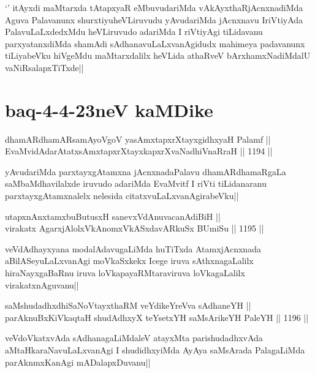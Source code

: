 \begin{artha}
`\stext' itAyxdi maMtarxda tAtapxyaR eMbuvudariMda vAkAyxthaRjAcnxnadiMda Aguva Palavanunx shurxtiyuheVLiruvudu yAvudariMda jAcnxnavu IriVtiyAda PalavuLaLxdedxMdu heVLiruvudo adariMda I riVtiyAgi tiLidavanu parxyatanxdiMda shamAdi sAdhanavuLaLxvanAgidudx mahimeya padavanunx tiLiyabeVku hiVgeMdu maMtarxdalilx heVLida athaRveV bArxhamxNadiMdalU vaNiRsalapxTiTxde||
\end{artha}

\section*{baq-4-4-23neV kaMDike}

\begin{shl}
dhamARdhamARsamAyoVgoV yasAmxtapxrXtayxgidhxyaH Palamf ||  \\
EvaMvidAdarAtatxsAmxtapxrXtayxkapxrXvaNadhiVnaRraH ||  1194 ||  
\end{shl}

\begin{artha}
yAvudariMda parxtayxgAtamxna jAcnxnadaPalavu dhamARdhamaRgaLa saMbaMdhavilalxde iruvudo adariMda EvaMvitf I riVti tiLidanaranu parxtayxgAtamxnalelx nelesida citatxvuLaLxvanAgirabeVku||
\end{artha}

\begin{shl}
utapxnAnxtamxbuButusxH sanevxVdAnuvacanAdiBiH || \\
virakatx AgarxjAlolxVkAnomxVkASxdavARkuSx BUmiSu ||  1195 || 
\end{shl}

\begin{artha}
veVdAdhayxyana modalAdavugaLiMda huTiTxda AtamxjAcnxnada aBilASeyuLaLxvanAgi moVkaSxkekx Icege iruva sAthxnagaLalilx hiraNayxgaBaRnu iruva loVkapayaRMtaraviruva loVkagaLalilx virakatxnAguvanu||
\end{artha}


\begin{shl}
saMshudadhxdhiSaNoV\s tayxthaRM veYdikeYreVva sAdhaneYH || \\
parAknuBxKiVkaqtaH shudAdhxyX teYsetxYH saMsArikeYH PaleYH ||  1196 ||  
\end{shl}

\begin{artha}
veVdoVkatxvAda sAdhanagaLiMdaleV atayxMta parishudadhxvAda aMtaHkaraNavuLaLxvanAgi I shudidhxyiMda AyAya saMsArada PalagaLiMda parAknmxKanAgi mADalapxDuvanu||
\end{artha}

